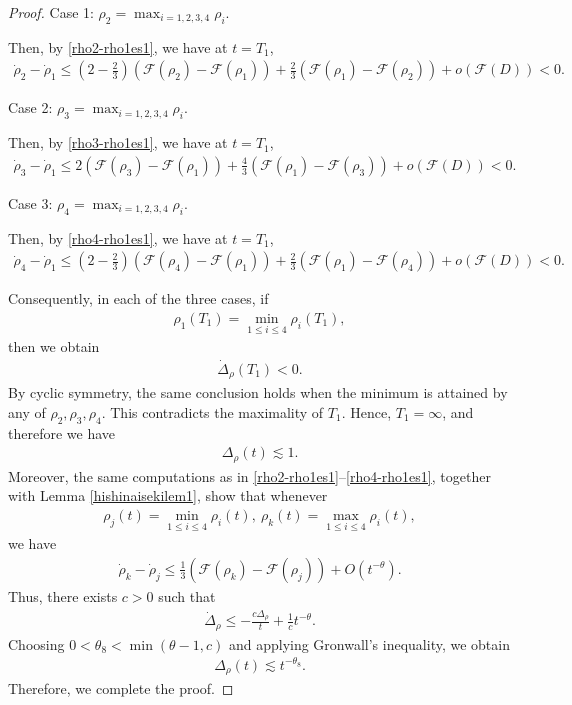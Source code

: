 \documentclass[reqno]{amsart}
\theoremstyle{plain}
\theoremstyle{definition}
\numberwithin{equation}{section}
\begin{document}
\begin{proof}
Case 1: $\rho_2=\max_{i=1,2,3,4}\rho_i$.


Then, by \eqref{rho2-rho1es1}, we have at $t=T_1$,
\begin{align*}
\dot{\rho}_2-\dot{\rho}_1\leq \left(2-\frac{2}{3}\right)\left(\mathcal{F}(\rho_2)-\mathcal{F}(\rho_1)\right)+\frac{2}{3}\left(\mathcal{F}(\rho_1)-\mathcal{F}(\rho_2)\right)+o\left(\mathcal{F}(D)\right)<0.
\end{align*}


Case 2: $\rho_3=\max_{i=1,2,3,4}\rho_i$.


Then, by \eqref{rho3-rho1es1}, we have at $t=T_1$,
\begin{align*}
\dot{\rho}_3-\dot{\rho}_1\leq 2\left(\mathcal{F}(\rho_3)-\mathcal{F}(\rho_1)\right)+\frac{4}{3}\left(\mathcal{F}(\rho_1)-\mathcal{F}(\rho_3)\right)+o\left(\mathcal{F}(D)\right)<0.
\end{align*}


Case 3: $\rho_4=\max_{i=1,2,3,4}\rho_i$.


Then, by \eqref{rho4-rho1es1}, we have at $t=T_1$,
\begin{align*}
\dot{\rho}_4-\dot{\rho}_1\leq \left(2-\frac{2}{3}\right)\left(\mathcal{F}(\rho_4)-\mathcal{F}(\rho_1)\right)+\frac{2}{3}\left(\mathcal{F}(\rho_1)-\mathcal{F}(\rho_4)\right)+o\left(\mathcal{F}(D)\right)<0.
\end{align*}


Consequently, in each of the three cases, if
\begin{align*}
\rho_1(T_1)=\min_{1\leq i\leq4}\rho_i(T_1),
\end{align*}
then we obtain
\begin{align*}
\dot{\Delta}_{\rho}(T_1)<0.
\end{align*}
By cyclic symmetry, the same conclusion holds when the minimum is attained by any of $\rho_2,\rho_3,\rho_4$. This contradicts the maximality of $T_1$. Hence, $T_1=\infty$, and therefore we have
\begin{align*}
\Delta_{\rho}(t)\lesssim1.
\end{align*}
Moreover, the same computations as in \eqref{rho2-rho1es1}--\eqref{rho4-rho1es1}, together with Lemma \ref{hishinaisekilem1}, show that whenever
\begin{align*}
\rho_j(t)=\min_{1\leq i\leq4}\rho_i(t),\ \rho_k(t)=\max_{1\leq i\leq4}\rho_i(t),
\end{align*}
we have
\begin{align*}
\dot{\rho}_k-\dot{\rho}_j\leq\frac{1}{3}\left(\mathcal{F}(\rho_k)-\mathcal{F}(\rho_j)\right)+O\left(t^{-\theta}\right).
\end{align*}
Thus, there exists $c>0$ such that 
\begin{align*}
\dot{\Delta}_{\rho}\leq -\frac{c\Delta_{\rho}}{t}+\frac{1}{c}t^{-\theta}.
\end{align*}
Choosing $0<\theta_8<\min{(\theta-1,c)}$ and applying Gronwall's inequality, we obtain
\begin{align*}
\Delta_{\rho}(t)\lesssim t^{-\theta_8}.
\end{align*}
Therefore, we complete the proof.

\end{proof}
\end{document}
